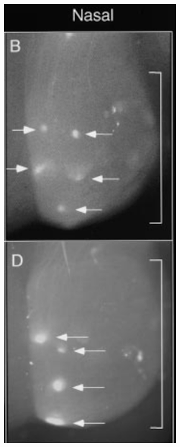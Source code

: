 \begin{figure}
\begin{subfigure}{0.33\textwidth}
	\caption{}
	\end{subfigure}
\qquad\qquad\qquad\qquad\qquad
	\begin{subfigure}{0.3\textwidth}
		\centering
		\includegraphics[width=\textwidth]{images/distributed_kernels/ephrinA2A5double}

\end{subfigure}
\end{figure}
